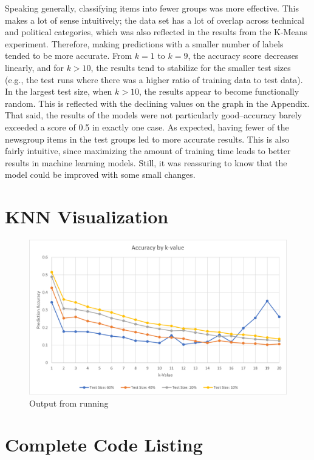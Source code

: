 \documentclass[11pt]{article}
\begin{document}
Speaking generally, classifying items into fewer groups was more effective.
This makes a lot of sense intuitively; the data set has a lot of overlap across technical and political categories, which was also reflected in the results from the K-Means experiment.
Therefore, making predictions with a smaller number of labels tended to be more accurate.
From $k=1$ to $k=9$, the accuracy score decreases linearly, and for $k > 10$, the results tend to stabilize for the smaller test sizes (e.g., the test runs where there was a higher ratio of training data to test data). In the largest test size, when $k > 10$, the results appear to become functionally random.
This is reflected with the declining values on the graph in the  Appendix.
That said, the results of the models were not particularly good--accuracy barely exceeded a score of 0.5 in exactly one case.
As expected, having fewer of the newsgroup items in the test groups led to more accurate results.
This is also fairly intuitive, since maximizing the amount of training time leads to better results in machine learning models.
Still, it was reassuring to know that the model could be improved with some small changes.

\newpage
\begin{appendices}
\section{KNN Visualization} \label{outputs}

\begin{figure}[H]
\centering
\includegraphics[width=6in]{images/knn.png}
\caption{Output from running}
\label{fig:out}
\end{figure}


\newpage
\section{Complete Code Listing} \label{codelist}


\end{appendices}
  
\end{document}
